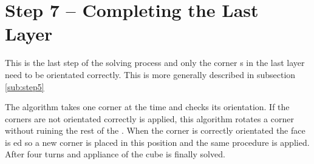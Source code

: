 \section{Step 7 -- Completing the Last Layer}
This is the last step of the solving process and only the corner \cpiece{}s in the last layer need to be orientated correctly. This is more generally described in subsection \ref{sub:step5}

The algorithm takes one corner \cpiece{} at the time and checks its orientation. If the corners are not orientated correctly  is applied, this algorithm rotates a corner without ruining the rest of the \cube{}. When the corner is correctly orientated the  face is \twist{}ed so a new corner is placed in this position and the same procedure is applied. After four  turns and appliance of  the cube is finally solved. 

\begin{comment}
In the last layer the corners in the last layer were poisitend correctly but not oreiented. In this step will the coreners be oreinted correctly and as result it will lead to that the \rubiks{} will be solved.

This step is very simple because it there is only four corners to control and either the corner is oriented correctly or is isn't.  

The program vil first control that the front-right-up corner is oriented correctly if not the will use the an algorithm twice and after the program vil control the corner again if the corner is not oriented correctly his time the use teh algorithme and will continue with this until the corner is oriented correctly. 
Then the corner is orented correctly the program will make at up move ("U") and will control the new corner and the program will do this with every corner in the last layer until they are oriented corectly.  

\end{comment}
